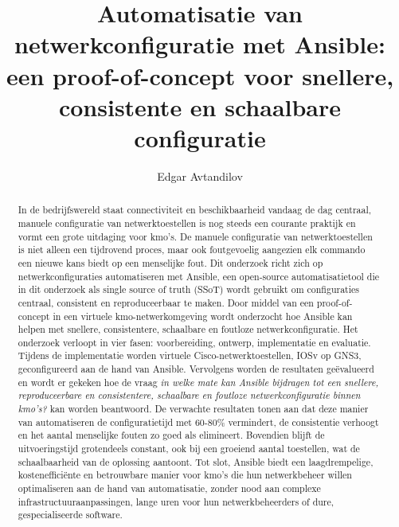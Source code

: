 \documentclass{hogent-article}
\title{Automatisatie van netwerkconfiguratie met Ansible: een proof-of-concept voor snellere, consistente en schaalbare configuratie}
\author{Edgar Avtandilov}
\begin{document}
\begin{abstract}
  In de bedrijfswereld staat connectiviteit en beschikbaarheid vandaag de dag centraal, manuele configuratie van netwerktoestellen is nog steeds een courante praktijk en vormt een grote uitdaging voor kmo's. 
  De manuele configuratie van netwerktoestellen is niet alleen een tijdrovend proces, maar ook foutgevoelig aangezien elk commando een nieuwe kans biedt op een menselijke fout. 
  Dit onderzoek richt zich op netwerkconfiguraties automatiseren met Ansible, een open-source automatisatietool die in dit onderzoek als single source of truth (SSoT) wordt gebruikt om configuraties centraal, consistent en reproduceerbaar te maken.
  Door middel van een proof-of-concept in een virtuele kmo-netwerkomgeving wordt onderzocht hoe Ansible kan helpen met snellere, consistentere, schaalbare en foutloze netwerkconfiguratie. 
  Het onderzoek verloopt in vier fasen: voorbereiding, ontwerp, implementatie en evaluatie. 
  Tijdens de implementatie worden virtuele Cisco-netwerktoestellen, IOSv op GNS3, geconfigureerd aan de hand van Ansible.
  Vervolgens worden de resultaten geëvalueerd en wordt er gekeken hoe de vraag \textit{in welke mate kan Ansible bijdragen tot een snellere, reproduceerbare en consistentere, schaalbare en foutloze netwerkconfiguratie binnen kmo's?} kan worden beantwoord.
  De verwachte resultaten tonen aan dat deze manier van automatiseren de configuratietijd met 60-80\% vermindert, de consistentie verhoogt en het aantal menselijke fouten zo goed als elimineert.
  Bovendien blijft de uitvoeringstijd grotendeels constant, ook bij een groeiend aantal toestellen, wat de schaalbaarheid van de oplossing aantoont.
  Tot slot, Ansible biedt een laagdrempelige, kostenefficiënte en betrouwbare manier voor kmo's die hun netwerkbeheer willen optimaliseren aan de hand van automatisatie, zonder nood aan complexe infrastructuuraanpassingen, lange uren voor hun netwerkbeheerders of dure, gespecialiseerde software.
\end{abstract}

\tableofcontents



\printbibliography[heading=bibintoc]
\end{document}
